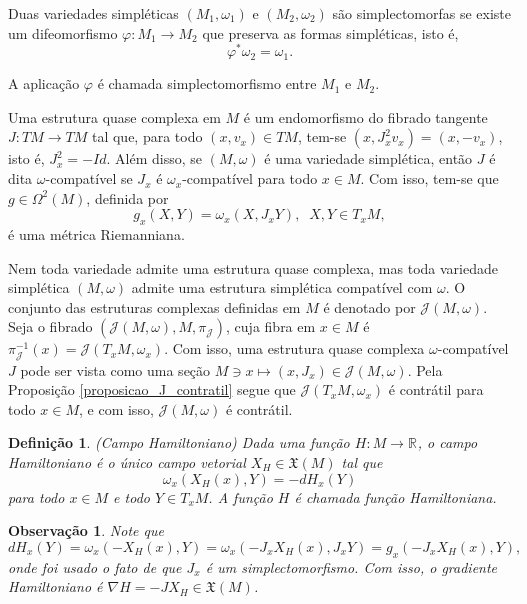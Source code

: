 \documentclass[12pt]{book}
\newtheorem{definicao}[teorema]{Definição}
\newtheorem{observacao}[teorema]{Observação}
\newcommand{\campossuaves}[1]{\mathfrak{X}(#1)}
\newcommand{\espacotangenteponto}[2]{T_{#1}#2}
\newcommand{\estruturascomplexas}[2]{\mathcal{J}(#1, #2)}
\newcommand{\estruturascomplexasM}{\estruturascomplexas{M}{\omega}}
\newcommand{\real}[1]{\mathbb{R}^{#1}}
\newcommand{\reta}{\real{}}
\begin{document}
	Duas variedades simpléticas $(M_{1}, \omega_{1})$ e $(M_{2}, \omega_{2})$ são simplectomorfas se existe um difeomorfismo $\varphi: M_{1}\to M_{2}$ que preserva as formas simpléticas, isto é,
	$$
	\varphi^{*}\omega_{2}=\omega_{1}.
	$$
	
	A aplicação $\varphi$ é chamada simplectomorfismo entre $M_{1}$ e $M_{2}$.
	
	Uma estrutura quase complexa em $M$ é um endomorfismo do fibrado tangente $J:TM \to TM$ tal que, para todo $(x,v_{x})\in TM$, tem-se $(x, J^{2}_{x}v_{x}) = (x, -v_{x})$, isto é, $J^{2}_{x}=-Id$. Além disso, se $(M, \omega)$ é uma variedade simplética, então $J$ é dita $\omega$-compatível se $J_{x}$ é $\omega_{x}$-compatível para todo $x\in M$. Com isso, tem-se que $g \in \Omega^{2}(M)$, definida por
	$$
	g_{x}(X, Y) =\omega_{x}(X, J_{x}Y),\;\;X, Y\in \espacotangenteponto{x}{M},
	$$
	é uma métrica Riemanniana.

	 Nem toda variedade admite uma estrutura quase complexa, mas toda variedade simplética $(M,\omega)$ admite uma estrutura simplética compatível com $\omega$. O conjunto das estruturas complexas definidas em $M$ é denotado por $\estruturascomplexasM$. Seja o fibrado $(\estruturascomplexasM, M,\pi_{\mathcal{J}})$, cuja fibra em $x\in M$ é $\pi_{\mathcal{J}}^{-1}(x) = \estruturascomplexas{\espacotangenteponto{x}{M}}{\omega_{x}}$. Com isso, uma estrutura quase complexa $\omega$-compatível $J$ pode ser vista como uma seção $M \ni x \mapsto (x, J_{x})\in \estruturascomplexasM$. Pela Proposição \ref{proposicao_J_contratil} segue que $\estruturascomplexas{\espacotangenteponto{x}{M}}{\omega_{x}}$ é contrátil para todo $x\in M$, e com isso, $\estruturascomplexasM$ é contrátil.
	
	\begin{definicao}
		(Campo Hamiltoniano) Dada uma função $H:M\to \reta$, o campo Hamiltoniano é o único campo vetorial $X_{H}\in \campossuaves{M}$ tal que
		$$
		\omega_{x}(X_{H}(x), Y) = -dH_{x}(Y)
		$$
		para todo $x\in M$ e todo $Y \in \espacotangenteponto{x}{M}$. A função $H$ é chamada função Hamiltoniana.
	\end{definicao}
	
	\begin{observacao}
		Note que 
		$$
		dH_{x}(Y)=\omega_{x}(-X_{H}(x), Y) =\omega_{x}(-J_{x}X_{H}(x), J_{x}Y) =g_{x}(-J_{x}X_{H}(x), Y),$$
		onde foi usado o fato de que $J_{x}$ é um simplectomorfismo. Com isso, o gradiente Hamiltoniano é $\nabla H = -JX_{H} \in \campossuaves{M}$.
	\end{observacao}
	
\end{document}
